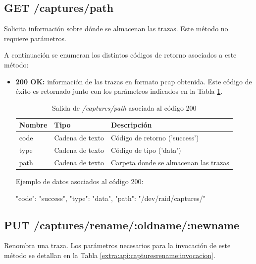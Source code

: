 %
%
\subsection{GET /captures/path}
Solicita información sobre dónde se almacenan las \glspl{traza}. Este método no requiere parámetros.

A continuación se enumeran los distintos códigos de retorno asociados a este método:
\begin{itemize}

\item{\textbf{200 OK:} información de las \glspl{traza} en formato \gls{pcap} obtenida. Este código de éxito es retornado junto con los parámetros indicados en la Tabla \ref{extra:api:capturespath:ok}.
\begin{table}[H]
\centering
\begin{tabular}{|l|l|l|}
\hline
\rowcolor[HTML]{F5F5F5}
\textbf{Nombre}                & \textbf{Tipo}   & \textbf{Descripción}                            \\ \hline
code                           & Cadena de texto & Código de retorno ('success')                   \\ \hline
type                           & Cadena de texto & Código de tipo ('data')                         \\ \hline
path                           & Cadena de texto & Carpeta donde se almacenan las \glspl{traza}    \\ \hline
\end{tabular}
\caption{Salida de \textit{/captures/path} asociada al código 200}
\label{extra:api:capturespath:ok}
\end{table}
\begin{minipage}{\textwidth}
Ejemplo de datos asociados al código 200:

\begin{code}[language=json]
{
  "code": "success",
  "type": "data",
  "path": "/dev/raid/captures/"
}
\end{code}
\end{minipage}
}

\end{itemize}

%
%
\subsection{PUT /captures/rename/:oldname/:newname}
Renombra una \gls{traza}. Los parámetros necesarios para la invocación de este método se detallan en la Tabla \ref{extra:api:capturesrename:invocacion}.

